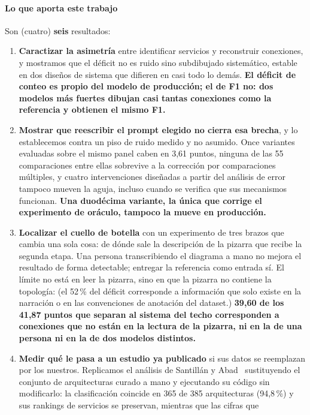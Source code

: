 \documentclass[a4paper, twocolumn, 10pt]{IEEEtran}
\newcommand{\nuevo}[1]{{\bfseries #1}}
\newcommand{\quitado}[1]{(#1)}
\begin{document}
\paragraph{Lo que aporta este trabajo} Son \quitado{cuatro} \nuevo{seis} resultados:
 
\begin{enumerate}\itemsep3pt
\item \textbf{Caractizar la asimetría} entre identificar servicios y
reconstruir conexiones, y mostramos que el déficit no es ruido sino subdibujado
sistemático, estable en dos diseños de sistema que difieren en casi todo lo
demás. \nuevo{El déficit de conteo es propio del modelo de producción; el de F1 no:
dos modelos más fuertes dibujan casi tantas conexiones como la referencia y
obtienen el mismo F1.}
\item \textbf{Mostrar que reescribir el prompt elegido no cierra esa brecha}, y
lo establecemos contra un piso de ruido medido y no asumido. Once variantes
evaluadas sobre el mismo panel caben en 3,61 puntos, ninguna de las 55
comparaciones entre ellas sobrevive a la corrección por comparaciones múltiples,
y cuatro intervenciones diseñadas a partir del análisis de error tampoco mueven
la aguja, incluso cuando se verifica que sus mecanismos funcionan. \nuevo{Una
duodécima variante, la única que corrige el experimento de oráculo, tampoco la
mueve en producción.}
\item \textbf{Localizar el cuello de botella} con un experimento de tres brazos
que cambia una sola cosa: de dónde sale la descripción de la pizarra que recibe
la segunda etapa. Una persona transcribiendo el diagrama a mano no mejora el
resultado de forma detectable; entregar la referencia como entrada sí. El límite
no está en leer la pizarra, sino en que la pizarra no contiene la topología:
\quitado{el 52\,\% del déficit corresponde a información que solo existe en la
narración o en las convenciones de anotación del dataset.} \nuevo{39,60 de los
41,87 puntos que separan al sistema del techo corresponden a conexiones que no
están en la lectura de la pizarra, ni en la de una persona ni en la de dos modelos
distintos.}
\item \textbf{Medir qué le pasa a un estudio ya publicado} si sus datos se
reemplazan por los nuestros. Replicamos el análisis de Santillán y
Abad~\cite{santillan2025hpc} sustituyendo el conjunto de arquitecturas curado a mano y ejecutando su
código sin modificarlo: la clasificación coincide en 365 de 385 arquitecturas
(94,8\,\%) y sus rankings de servicios se preservan, mientras que las cifras que

\end{enumerate}
\end{document}
